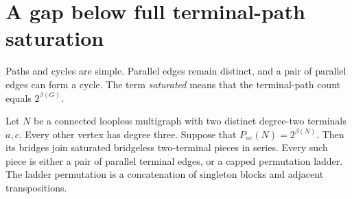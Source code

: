 \section{A gap below full terminal-path saturation}
\label{sec:second-order-path-gap}

Paths and cycles are simple.
Parallel edges remain distinct, and a pair of parallel edges can form a cycle.
The term \emph{saturated} means that the terminal-path count equals $2^{\beta(G)}$.

\begin{lemma}\label{lem:full-two-pole-classification}
Let $N$ be a connected loopless multigraph with two distinct degree-two terminals $a,c$.
Every other vertex has degree three.
Suppose that $P_{ac}(N)=2^{\beta(N)}$.
Then its bridges join saturated bridgeless two-terminal pieces in series.
Every such piece is either a pair of parallel terminal edges, or a capped permutation ladder.
The ladder permutation is a concatenation of singleton blocks and adjacent transpositions.
\end{lemma}

